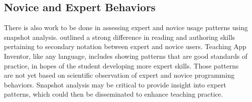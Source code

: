 \subsection{Novice and Expert Behaviors}
There is also work to be done in assessing expert and novice usage patterns using snapshot analysis. \cite{petre-1995} outlined a strong difference in reading and authoring skills pertaining to secondary notation between expert and novice users. Teaching App Inventor, like any language, includes showing patterns that are good standards of practice, in hopes of the student developing more expert skills. Those patterns are not yet based on scientific observation of expert and novice programming behaviors. Snapshot analysis may be critical to provide insight into expert patterns, which could then be disseminated to enhance teaching practice. 

